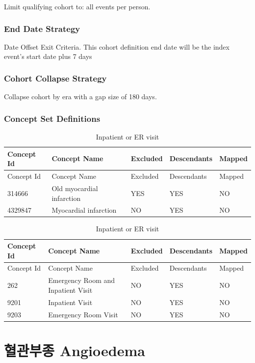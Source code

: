 \documentclass[10.5pt]{book}
\theoremstyle{definition}
\theoremstyle{definition}
\theoremstyle{definition}
\theoremstyle{remark}
\begin{document}
Limit qualifying cohort to: all events per person.

\subsubsection*{End Date Strategy}\label{end-date-strategy-2}

Date Offset Exit Criteria. This cohort definition end date will be the
index event's start date plus 7 days

\subsubsection*{Cohort Collapse
Strategy}\label{cohort-collapse-strategy-2}

Collapse cohort by era with a gap size of 180 days.

\subsubsection*{Concept Set
Definitions}\label{concept-set-definitions-2}

\begin{longtable}[]{@{}lllll@{}}
\caption{\label{tab:ami} Inpatient or ER visit}\tabularnewline
\toprule
Concept Id & Concept Name & Excluded & Descendants &
Mapped\tabularnewline
\midrule
\endfirsthead
\toprule
Concept Id & Concept Name & Excluded & Descendants &
Mapped\tabularnewline
\midrule
\endhead
314666 & Old myocardial infarction & YES & YES & NO\tabularnewline
4329847 & Myocardial infarction & NO & YES & NO\tabularnewline
\bottomrule
\end{longtable}

\begin{longtable}[]{@{}lllll@{}}
\caption{\label{tab:inpatientOrErAmi} Inpatient or ER visit}\tabularnewline
\toprule
Concept Id & Concept Name & Excluded & Descendants &
Mapped\tabularnewline
\midrule
\endfirsthead
\toprule
Concept Id & Concept Name & Excluded & Descendants &
Mapped\tabularnewline
\midrule
\endhead
262 & Emergency Room and Inpatient Visit & NO & YES & NO\tabularnewline
9201 & Inpatient Visit & NO & YES & NO\tabularnewline
9203 & Emergency Room Visit & NO & YES & NO\tabularnewline
\bottomrule
\end{longtable}

\section{혈관부종 Angioedema}\label{Angioedema}
\end{document}
